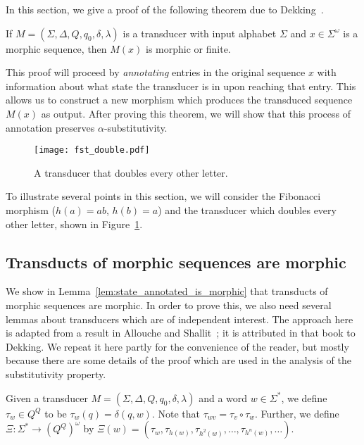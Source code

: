\def\d{\delta}
\def\e{\epsilon}

\label{section-Dekking}
In this section, we give a proof of  the following theorem due to Dekking~\cite{dekk:94}.

\begin{theorem}\label{the:transducts_preserve_morphic}
  If $M = (\Sigma, \Delta, Q, q_0, \delta, \lambda)$ is a transducer with input alphabet $\Sigma$ 
  and $x \in \Sigma^\omega$ is a morphic sequence, then $M(x)$ is morphic or finite.
\end{theorem}

This proof will proceed by \emph{annotating} entries in the original sequence $x$ 
with information about what state the transducer is in upon reaching that entry.
This allows us to construct a new morphism which produces the transduced sequence $M(x)$ as output. 
After proving this theorem, we will show that this process of annotation preserves $\alpha$-substitutivity.

\begin{figure}[h!]
  \centering
  \texttt{[image: fst\_double.pdf]}
  \caption{A transducer that doubles every other letter.}
  \label{fig:double}
\end{figure}

\begin{example}\label{example-transducer}
  To illustrate several points in this section,
  we will consider the Fibonacci morphism ($h(a) = ab$, $h(b) = a$) 
  and the transducer which doubles every other letter, shown in Figure~\ref{fig:double}. 
\end{example}

\subsection{Transducts of morphic sequences are morphic}



We show in Lemma~\ref{lem:state_annotated_is_morphic} that transducts of morphic sequences
are morphic.
In order to prove this, we  also need several lemmas about transducers which are of independent interest. 
The approach here is adapted from a result in Allouche and Shallit~\cite{allo:shal:2003}; it is  attributed in that book  to Dekking. 
We repeat it here partly for the convenience of the reader, but mostly because there are some details of the proof which 
are used in the analysis of the substitutivity property.

\begin{definition}[$\tau_w$, $\Xi(w)$]
  Given a transducer $M = (\Sigma, \Delta, Q, q_0, \delta, \lambda)$ and a word $w \in \Sigma^*$,
  we define $\tau_w \in Q^Q$ to be $\tau_w(q) = \d(q, w)$. Note that $\tau_{wv} = \tau_v \circ \tau_w$.
  Further, we define $\Xi: \Sigma^*\to  (Q^Q)^\omega$ by
  $\Xi(w) = (\tau_w, \tau_{h(w)}, \tau_{h^2(w)}, \ldots, \tau_{h^n(w)}, \ldots)$.
  \label{definition-tau}
\end{definition}


